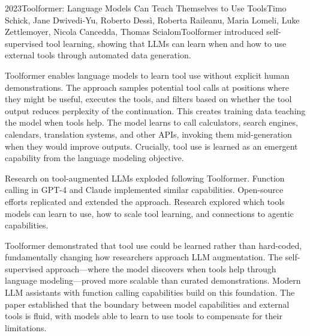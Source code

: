 
\begin{papersummary}{2023}{Toolformer: Language Models Can Teach Themselves to Use Tools}{Timo Schick, Jane Dwivedi-Yu, Roberto Dess\`{i}, Roberta Raileanu, Maria Lomeli, Luke Zettlemoyer, Nicola Cancedda, Thomas Scialom}{Toolformer introduced self-supervised tool learning, showing that LLMs can learn when and how to use external tools through automated data generation.}

Toolformer enables language models to learn tool use without explicit human demonstrations. The approach samples potential tool calls at positions where they might be useful, executes the tools, and filters based on whether the tool output reduces perplexity of the continuation. This creates training data teaching the model when tools help. The model learns to call calculators, search engines, calendars, translation systems, and other APIs, invoking them mid-generation when they would improve outputs. Crucially, tool use is learned as an emergent capability from the language modeling objective.

Research on tool-augmented LLMs exploded following Toolformer. Function calling in GPT-4 and Claude implemented similar capabilities. Open-source efforts replicated and extended the approach. Research explored which tools models can learn to use, how to scale tool learning, and connections to agentic capabilities.

Toolformer demonstrated that tool use could be learned rather than hard-coded, fundamentally changing how researchers approach LLM augmentation. The self-supervised approach---where the model discovers when tools help through language modeling---proved more scalable than curated demonstrations. Modern LLM assistants with function calling capabilities build on this foundation. The paper established that the boundary between model capabilities and external tools is fluid, with models able to learn to use tools to compensate for their limitations.

\end{papersummary}
